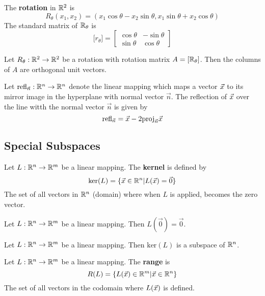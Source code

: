 \documentclass[english, 12pt]{article}
\begin{document}
\begin{defn}
The \textbf{rotation} in ${\mathbb{R}}^2$ is
\[R_{\theta}(x_{1},x_{2}) = (x_{1} \cos \theta - x_{2} \sin \theta, x_{1} \sin \theta + x_{2} \cos \theta)\]
The standard matrix of ${\mathbb{R}}_{\theta}$ is
\[ \lbrack r_{\theta} \rbrack = \begin{bmatrix} \cos \theta & -\sin \theta \\ \sin \theta & \cos \theta \end{bmatrix}\]
\end{defn}

\begin{thrm}
Let $R_{\theta}: {\mathbb{R}}^2 \rightarrow {\mathbb{R}}^2$ be a rotation with rotation matrix $A = \lbrack {\mathbb{R}}_{\theta} \rbrack$. Then the columns of $A$ are orthogonal unit vectors.
\end{thrm}

\begin{defn}
Let $\text{refl}_{\vec{n}}: {\mathbb{R}}^n \rightarrow {\mathbb{R}}^n$ denote the linear mapping which maps a vector $\vec{x}$ to its mirror image in the hyperplane with normal vector $\vec{n}$. The reflection of $\vec{x}$ over the line witth the normal vector $\vec{n}$ is given by
\[\text{refl}_{\vec{n}} = \vec{x} - 2 \text{proj}_{\vec{n}} \vec{x}\]
\end{defn}

\subsection{Special Subspaces}
\begin{defn}
Let $L:{\mathbb{R}}^n \rightarrow {\mathbb{R}}^m$ be a linear mapping. The \textbf{kernel} is defined by
\[\text{ker}(L) = \{ \vec{x} \in {\mathbb{R}}^n | L(\vec{x}) = \vec{0}\}\]
The set of all vectors in ${\mathbb{R}}^n$ (domain) where when $L$ is applied, becomes the zero vector.
\end{defn}

\begin{thrm}
Let $L:{\mathbb{R}}^n \rightarrow {\mathbb{R}}^m$ be a linear mapping. Then $L(\vec{0}) = \vec{0}$.
\end{thrm}

\begin{thrm}
Let $L: {\mathbb{R}}^n \rightarrow {\mathbb{R}}^m$ be a linear mapping. Then $\text{ker}(L)$ is a subspace of ${\mathbb{R}}^n$.
\end{thrm}

\begin{defn}
Let $L: {\mathbb{R}}^n \rightarrow {\mathbb{R}}^m$ be a linear mapping. The \textbf{range} is
\[R(L) = \{ L(\vec{x}) \in {\mathbb{R}}^m | \vec{x} \in {\mathbb{R}}^n\}\]
The set of all vectors in the codomain where $L(\vec{x})$ is defined.
\end{defn}
\end{document}
